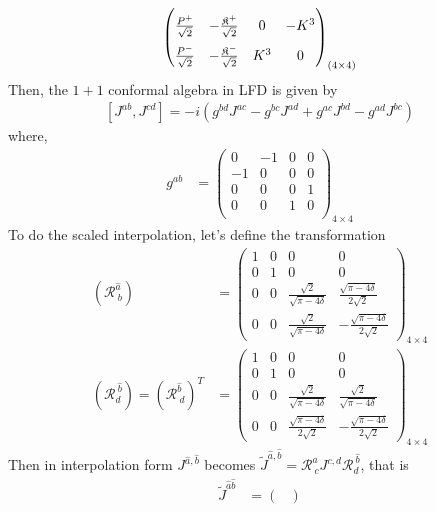 \documentclass[]{article}
\numberwithin{equation}{section}
\begin{document}
{{\begin{align}
\begin{pmatrix}
    \rule{0pt}{16pt} \frac{P^{{+}}}{\sqrt{2}}&-\frac{\mathfrak{K}^{{+}}}{\sqrt{2}}&0  & -K^3\\
    \rule{0pt}{16pt} \frac{P^{{-}}}{\sqrt{2}}&-\frac{\mathfrak{K}^{{-}}}{\sqrt{2}}&K^3  & 0
  \end{pmatrix}_{(4\times4)}
\end{align}
Then, the $1+1$ conformal algebra in LFD is given by
  \begin{align}
      \left[J^{{{a}}{{b}}},J^{{{c}}{{d}}}\right]=-i\left(g^{{{b}}{{d}}}J^{{{a}}{{c}}}-g^{{{b}}{{c}}}J^{{{a}}{{d}}}+g^{{{a}}{{c}}}J^{{{b}}{{d}}}-g^{{{a}}{{d}}}J^{{{b}}{{c}}}\right)\label{AM_algebra}
  \end{align}
where, 
\begin{align}
    g^{{a}{b}}&=\begin{pmatrix}
  0&-1&0&0\\
  -1&0&0&0\\
  0&0&0&1\\
  0&0&1&0\\
  \end{pmatrix}_{4\times4}
\end{align}
To do the scaled interpolation, let's define the transformation 
\begin{align}
    (\mathcal{R}^{\hat{a}}_{~b})&=\begin{pmatrix}
    1&0&0&0\\
    0&1&0&0\\
    0&0&\frac{\sqrt{2}}{\sqrt{\pi-4\delta}} & \frac{\sqrt{\pi-4\delta}}{2\sqrt{2}}\\
    0&0&\frac{\sqrt{2}}{\sqrt{\pi-4\delta}} & -\frac{\sqrt{\pi-4\delta}}{2\sqrt{2}}
    \end{pmatrix}_{4\times4}\\
    (\mathcal{R}^{~\hat{b}}_{{d}})=(\mathcal{R}^{\hat{b}}_{{~d}})^{T}&=\begin{pmatrix}
    1&0&0&0\\
    0&1&0&0\\
    0&0&\frac{\sqrt{2}}{\sqrt{\pi-4\delta}}  & \frac{\sqrt{2}}{\sqrt{\pi-4\delta}}\\
    0&0&\frac{\sqrt{\pi-4\delta}}{2\sqrt{2}}  & -\frac{\sqrt{\pi-4\delta}}{2\sqrt{2}}
    \end{pmatrix}_{4\times4}
\end{align}
Then in interpolation form $J^{\hat{a},\hat{b}}$ becomes $\tilde{J}^{\hat{a},\hat{b}}=\mathcal{R}^{\hat{a}}_{~{c}}J^{c,d}\mathcal{R}^{~\hat{b}}_{{d}}$, that is
\begin{align}
    \tilde{J}^{\hat{a}\hat{b}}&=\begin{pmatrix}

\end{pmatrix}
\end{align}}}
\end{document}
